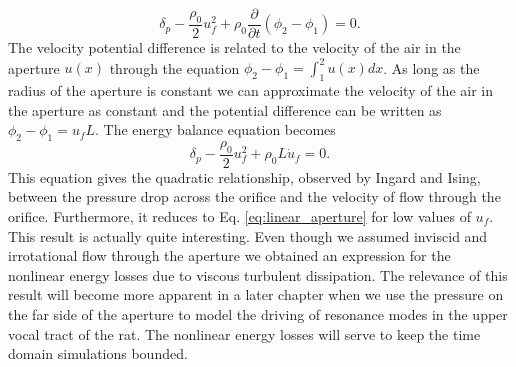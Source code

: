 \documentclass[12pt, letter]{report}
\begin{document}
\begin{equation}  
\delta_p - \frac{\rho_0}{2} u_f^2 + \rho_0 \frac{\partial }{\partial t}\left( \phi_2 - \phi_1  \right) = 0.
\end{equation}
The velocity potential difference is related to the velocity of the air in the aperture $u(x)$ through the equation $\phi_2 - \phi_1 = \int_1^2 u(x) dx$. As long as the radius of the aperture is constant we can approximate the velocity of the air in the aperture as constant and the potential difference can be written as $\phi_2 - \phi_1 = u_f L$. The energy balance equation becomes 
\begin{equation}  
\label{eq:nonlinear_aperture}
\delta_p - \frac{\rho_0}{2} u_f^2 + \rho_0 L \dot{u}_f = 0.
\end{equation}
This equation gives the quadratic relationship, observed by Ingard and Ising, between the pressure drop across the orifice and the velocity of flow through the orifice. Furthermore, it reduces to Eq. \ref{eq:linear_aperture} for low values of $u_f$. This result is actually quite interesting. Even though we assumed inviscid and irrotational flow through the aperture we obtained an expression for the nonlinear energy losses due to viscous turbulent dissipation. The relevance of this result will become more apparent in a later chapter when we use the pressure on the far side of the aperture to model the driving of resonance modes in the upper vocal tract of the rat. The nonlinear energy losses will serve to keep the time domain simulations bounded.  


\end{document}
